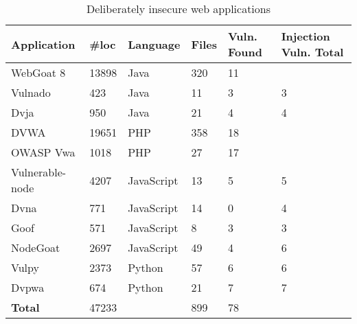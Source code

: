 \begin{table*}[htbp]
    \caption{Deliberately insecure web applications}
    \begin{center}
        \begin{tabular}{|l|| l | l  |l | l | l |}
            \hline
            \textbf{Application}  & \textbf{\#loc}      & \textbf{Language}      & \textbf{Files}     & \textbf{Vuln. Found } & \textbf{Injection Vuln. Total} \\ [0.5ex] 
            \hline\hline   
            WebGoat 8             & 13898     & Java       & 320        & 11 &  \\
            \hline
            Vulnado               & 423       & Java       & 11         & 3 & 3  \\
            \hline
            Dvja                  & 950       & Java       & 21         & 4 & 4\\
            \hline
             DVWA                 & 19651     & PHP        & 358        & 18 &  \\
            \hline
             OWASP Vwa            & 1018      & PHP        & 27         & 17 & \\   
            \hline
             Vulnerable-node      & 4207      & JavaScript & 13         & 5 & 5 \\  
            \hline
             Dvna                 & 771      & JavaScript  & 14         & 0 & 4 \\
            \hline
             Goof                 & 571      & JavaScript  & 8         & 3 & 3\\
            \hline  
             NodeGoat                 & 2697      & JavaScript  & 49   & 4 & 6\\
            \hline  
             Vulpy                 & 2373      & Python    & 57         & 6  & 6\\
            \hline  
             Dvpwa                 & 674      & Python    & 21         & 7  & 7 \\   [0.5ex]  
            \hline\hline   
            \textbf{Total}        & 47233 &              &  899 &  78  & \\
            \hline
        \end{tabular}
    \label{results}
    \end{center}
\end{table*} 


